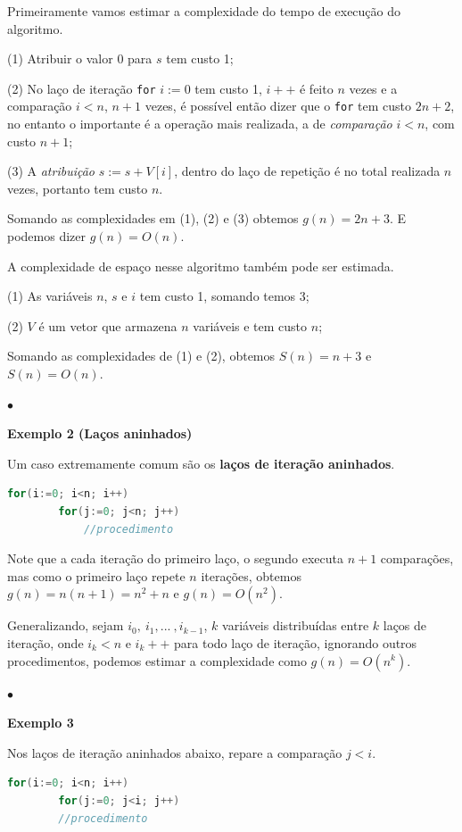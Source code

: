 Primeiramente vamos estimar a complexidade do tempo de execução do algoritmo. 

(1) Atribuir o valor 0 para $s$ tem custo 1; 

(2) No laço de iteração \texttt{for} $i:=0$ tem custo 1, $i++$ é feito $n$ vezes e a comparação $i<n$, $n+1$ vezes, é possível então dizer que o \texttt{for} tem custo $2n+2$, no entanto  o importante é a operação mais realizada, a de \textit{comparação} $i<n$, com custo $n+1$;

(3) A \textit{atribuição} $s:=s+V[i]$, dentro do laço de repetição é no total realizada $n$ vezes, portanto tem custo $n$.

Somando as complexidades em (1), (2) e (3) obtemos $g(n)=2n+3$. E podemos dizer $g(n)=O(n)$.

A complexidade de espaço nesse algoritmo também pode ser estimada.

(1) As variáveis $n$, $s$ e $i$ tem custo 1, somando temos 3;

(2) $V$ é um vetor que armazena $n$ variáveis e tem custo $n$;

Somando as complexidades de (1) e (2), obtemos $S(n)=n+3$ e $S(n)=O(n)$.

{\raggedleft $\bullet$ \par}

\textbf{Exemplo 2 (Laços aninhados)}

Um caso extremamente comum são os \textbf{laços de iteração aninhados}.
\begin{lstlisting}[language=C, frame=single]
    for(i:=0; i<n; i++)
        for(j:=0; j<n; j++)
            //procedimento
\end{lstlisting}

Note que a cada iteração do primeiro laço, o segundo executa $n+1$ comparações, mas como o primeiro laço repete $n$ iterações, obtemos $g(n)=n(n+1)=n^2+n$ e $g(n)=O(n^2)$.

Generalizando, sejam $i_0, \ i_1, ... \ , i_{k-1}$, $k$ variáveis distribuídas entre $k$ laços de iteração, onde $i_k<n$ e $i_k++$ para todo laço de iteração, ignorando outros procedimentos, podemos estimar a complexidade como $g(n)=O(n^k)$.

{\raggedleft $\bullet$ \par}

\textbf{Exemplo 3}

Nos laços de iteração aninhados abaixo, repare a comparação $j<i$.

\begin{lstlisting}[language=C, frame=single]
    for(i:=0; i<n; i++)
        for(j:=0; j<i; j++)
        //procedimento
\end{lstlisting}

